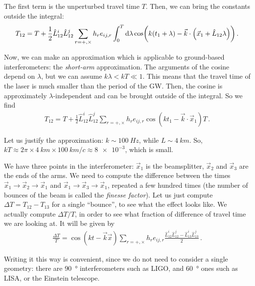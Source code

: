 \documentclass[main.tex]{subfiles}
\begin{document}
The first term is the unperturbed travel time  \(T\). Then, we can bring the constants outside the integral: 
%
\begin{align}
T_{12} = T + \frac{1}{2} \hat{L}_{12}^{i} \hat{L}_{12}^{j} \sum _{r = +, \times } h_{r} e_{ij, r}  \int_{0}^{T} \dd{\lambda }  \cos(k (t_1 + \lambda ) - \vec{k} \cdot \qty(\vec{x}_{1} + \hat{L}_{12} \lambda ))
\,.
\end{align}

Now, we can make an approximation which is applicable to ground-based interferometers: the \emph{short-arm} approximation. The arguments of the cosine depend on \(\lambda \), but we can assume \(k \lambda  < kT \ll 1\). This means that the travel time of the laser is much smaller than the period of the GW. Then, the cosine is approximately \(\lambda \)-independent and can be brought outside of the integral. So we find 
%
\begin{align}
T_{12} = T + \frac{1}{2} \hat{L}_{12}^{i} \hat{L}_{12}^{j} \sum _{r = +, \times } h_{r} e_{ij, r} \cos(k t_1 - \vec{k} \cdot \vec{x}_{1}) T
\,.
\end{align}

Let us justify the approximation: \(k \sim \SI{100}{Hz}\), while \(L \sim \SI{4}{km}\). So, \(kT \approx 2 \pi \times \SI{4}{km} \times \SI{100}{km} / c \approx \num{8e-3}\), which is small. 

We have three points in the interferometer: \(\vec{x}_{1}\) is the beamsplitter, \(\vec{x}_{2}\) and \(\vec{x}_{3}\) are the ends of the arms. We need to compute the difference between the times \(\vec{x}_{1} \rightarrow \vec{x}_{2} \rightarrow \vec{x}_{1}\) and \(\vec{x}_{1} \rightarrow \vec{x}_{3} \rightarrow \vec{x}_{1}\), repeated a few hundred times (the number of bounces of the beam is called the \emph{finesse factor}). Let us just compute \(\Delta T = T_{12} - T_{13} \) for a single ``bounce'', to see what the effect looks like. We actually compute \(\Delta T / T\), in order to see what fraction of difference of travel time we are looking at. It will be given by 
%
\begin{align}
\frac{\Delta T}{T} = \cos(kt - \vec{k} \vec{x}) \sum _{r = + , \times } h_{r} e_{ij, r} \frac{\hat{L}_{12}^{i}\hat{L}_{12}^{j} - \hat{L}_{13}^{i}\hat{L}_{13}^{j}}{2}
\,.
\end{align}

Writing it this way is convenient, since we do not need to consider a single geometry: there are \SI{90}{\degree} interferometers such as LIGO, and \SI{60}{\degree} ones such as LISA, or the Einstein telescope. 
\end{document}
